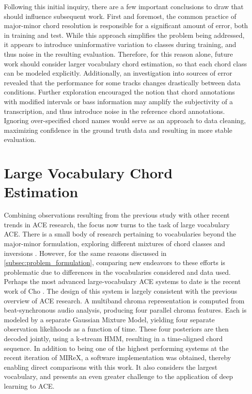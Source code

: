 Following this initial inquiry, there are a few important conclusions to draw that should influence subsequent work.
First and foremost, the common practice of major-minor chord resolution is responsible for a significant amount of error, both in training and test.
While this approach simplifies the problem being addressed, it appears to introduce uninformative variation to classes during training, and thus noise in the resulting evaluation.
Therefore, for this reason alone, future work should consider larger vocabulary chord estimation, so that each chord class can be modeled explicitly.
Additionally, an investigation into sources of error revealed that the performance for some tracks changes drastically between data conditions.
Further exploration encouraged the notion that chord annotations with modified intervals or bass information may amplify the subjectivity of a transcription, and thus introduce noise in the reference chord annotations.
Ignoring over-specified chord names would serve as an approach to data cleaning, maximizing confidence in the ground truth data and resulting in more stable evaluation.


\section{Large Vocabulary Chord Estimation}
\label{subsec:large_vocabulary_ace}

Combining observations resulting from the previous study with other recent trends in ACE research, the focus now turns to the task of large vocabulary ACE.
There is a small body of research pertaining to vocabularies beyond the major-minor formulation, exploring different mixtures of chord classes and inversions \cite{Mauch, Ni, McVicar}.
However, for the same reasons discussed in \ref{subsec:problem_formulation}, comparing new endeavors to these efforts is problematic due to differences in the vocabularies considered and data used.
Perhaps the most advanced large-vocabulary ACE systems to date is the recent work of Cho \cite{Cho2014}.
The design of this system is largely consistent with the previous overview of ACE research.
A multiband chroma representation is computed from beat-synchronous audio analysis, producing four parallel chroma features.
Each is modeled by a separate Gaussian Mixture Model, yielding four separate observation likelihoods as a function of time.
These four posteriors are then decoded jointly, using a k-stream HMM, resulting in a time-aligned chord sequence.
In addition to being one of the highest performing systems at the recent iteration of MIReX, a software implementation was obtained, thereby enabling direct comparisons with this work.
It also considers the largest vocabulary, and presents an even greater challenge to the application of deep learning to ACE.


